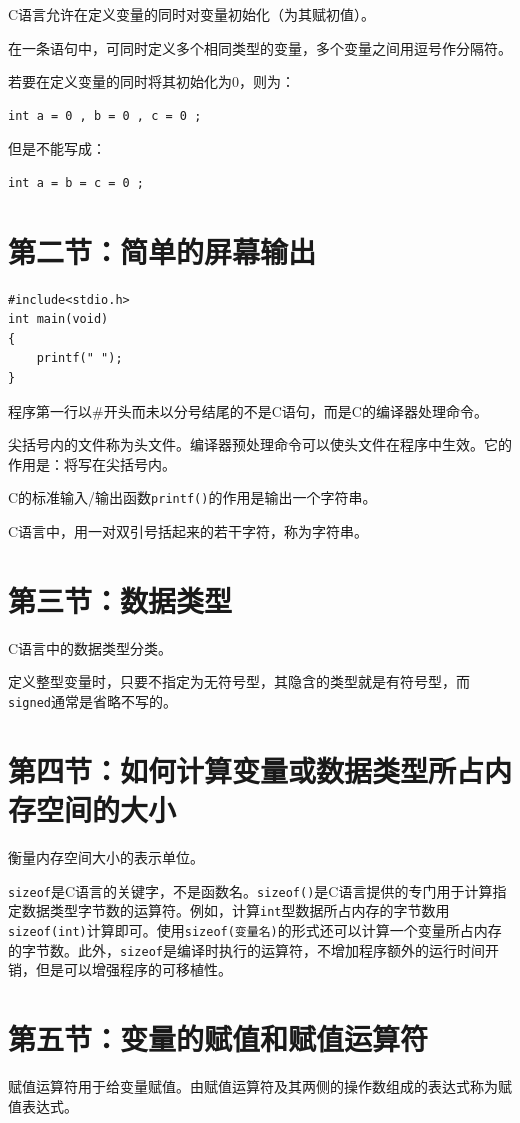 \documentclass{article}
\begin{document}
C语言允许在定义变量的同时对变量初始化（为其赋初值）。

在一条语句中，可同时定义多个相同类型的变量，多个变量之间用逗号作分隔符。

若要在定义变量的同时将其初始化为0，则为：
\begin{lstlisting}
int a = 0 , b = 0 , c = 0 ;
\end{lstlisting}

但是不能写成：
\begin{lstlisting}
int a = b = c = 0 ;
\end{lstlisting}


\section{第二节：简单的屏幕输出}
\begin{lstlisting}
#include<stdio.h>
int main(void)
{
	printf(" ");
}
\end{lstlisting}

程序第一行以\#开头而未以分号结尾的不是C语句，而是C的编译器处理命令。

尖括号内的文件称为头文件。编译器预处理命令可以使头文件在程序中生效。它的作用是：将写在尖括号内。

C的标准输入/输出函数\texttt{printf()}的作用是输出一个字符串。

C语言中，用一对双引号括起来的若干字符，称为字符串。


\section{第三节：数据类型}
C语言中的数据类型分类。

定义整型变量时，只要不指定为无符号型，其隐含的类型就是有符号型，而\texttt{signed}通常是省略不写的。


\section{第四节：如何计算变量或数据类型所占内存空间的大小}
衡量内存空间大小的表示单位。

\texttt{sizeof}是C语言的关键字，不是函数名。\texttt{sizeof()}是C语言提供的专门用于计算指定数据类型字节数的运算符。例如，计算\texttt{int}型数据所占内存的字节数用\texttt{sizeof(int)}计算即可。使用\texttt{sizeof(变量名)}的形式还可以计算一个变量所占内存的字节数。此外，\texttt{sizeof}是编译时执行的运算符，不增加程序额外的运行时间开销，但是可以增强程序的可移植性。


\section{第五节：变量的赋值和赋值运算符}
赋值运算符用于给变量赋值。由赋值运算符及其两侧的操作数组成的表达式称为赋值表达式。
\end{document}
